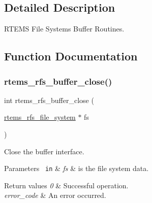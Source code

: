 \subsection{Detailed Description}
R\+T\+E\+MS File Systems Buffer Routines. 



\subsection{Function Documentation}
\mbox{\label{rtems-rfs-buffer_8c_ae5b347848c87353252dde82820821b05}} 
\subsubsection{\texorpdfstring{rtems\_rfs\_buffer\_close()}{rtems\_rfs\_buffer\_close()}}
{\footnotesize\ttfamily int rtems\+\_\+rfs\+\_\+buffer\+\_\+close (\begin{DoxyParamCaption}\item[{\mbox{\hyperlink{struct__rtems__rfs__file__system}{rtems\+\_\+rfs\+\_\+file\+\_\+system}} $\ast$}]{fs }\end{DoxyParamCaption})}

Close the buffer interface.


\begin{DoxyParams}[1]{Parameters}
\mbox{\texttt{ in}}  & {\em fs} & is the file system data.\\
\hline
\end{DoxyParams}

\begin{DoxyRetVals}{Return values}
{\em 0} & Successful operation. \\
\hline
{\em error\+\_\+code} & An error occurred. \\
\hline
\end{DoxyRetVals}
\mbox{\label{rtems-rfs-buffer_8c_ab50227fce5883f922c86d14e0e558270}} 
